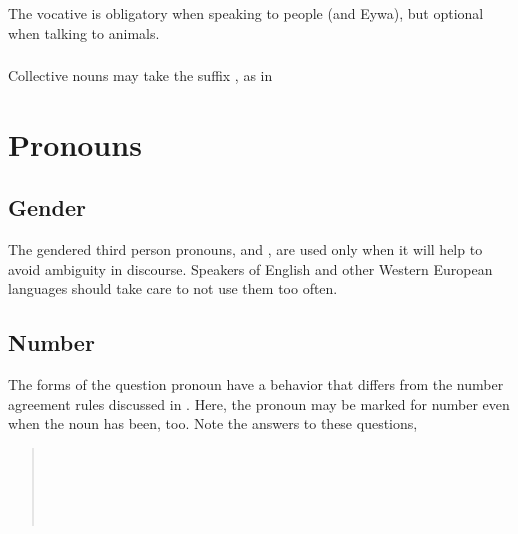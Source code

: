 \subsubsection{}
The vocative is obligatory when speaking to people (and Eywa), but
optional when talking to animals.

\subsubsection{} Collective nouns may take the suffix , as in
 


\section{Pronouns}


\subsection{Gender} The gendered third person pronouns,  and
, are used only when it will help to avoid ambiguity in
discourse.  Speakers of English and other Western European languages
should take care to not use them too often. \label{syn:pron:gender}

\subsection{Number} The forms of the question pronoun  have
a behavior that differs from the number agreement rules discussed
in . \label{syn:pron:q-number}
Here, the pronoun may be marked for number even when the noun has
been, too.  Note the answers to these questions,

\begin{quotation}
\noindent{} \\
\noindent{} \\

\noindent{} \\
\noindent{}\\
\indent{}
\end{quotation}

